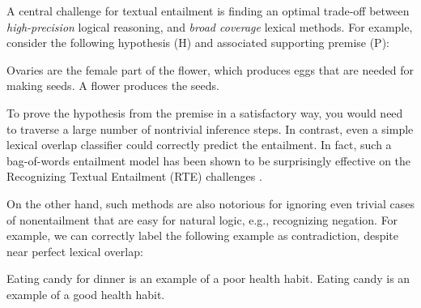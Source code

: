 A central challenge for textual entailment is finding an optimal trade-off between
  \textit{high-precision} logical reasoning, and \textit{broad coverage}
  lexical methods.
For example, consider the following hypothesis (H) and associated supporting premise (P):

\entailmentExample
{Ovaries are the female part of the flower, which produces eggs that are needed for making seeds.}
{A flower produces the seeds.}

To prove the hypothesis from the premise in a satisfactory way, you would need
  to traverse a large number of nontrivial inference steps.
In contrast, even a simple lexical overlap classifier could correctly predict
  the entailment.
In fact, such a bag-of-words entailment model has been shown to be surprisingly
  effective on the Recognizing Textual Entailment (RTE) challenges 
  \cite{key:2009maccartney-thesis}.

On the other hand, such methods are also notorious for ignoring even trivial 
  cases of nonentailment that are easy for natural logic, e.g., recognizing negation.
For example, we can correctly label the following example
  as contradiction, despite near perfect lexical overlap:

\entailmentExample
{Eating candy for dinner is an example of a poor health habit.}
{Eating candy is an example of a good health habit.}



